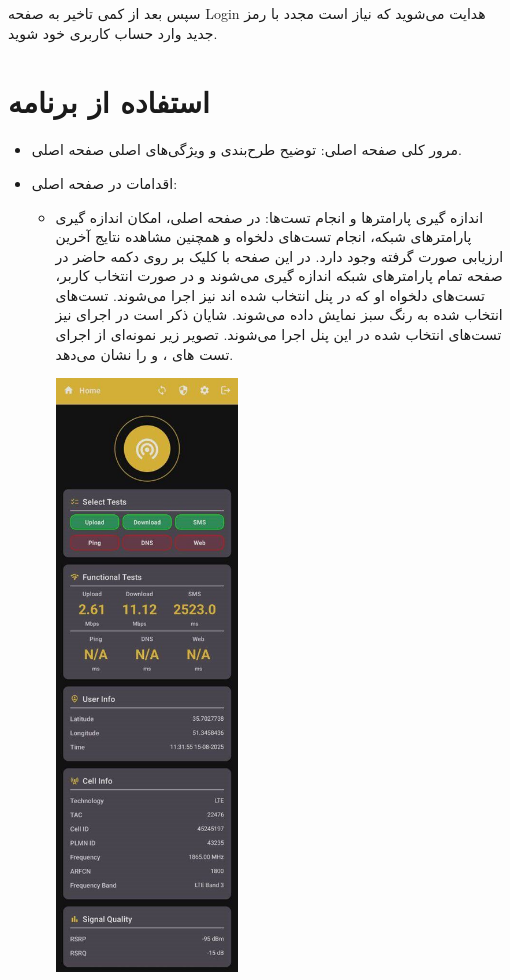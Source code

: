\begin{itemize}
\begin{itemize}
\begin{center}
			\end{center}
		سپس بعد از کمی تاخیر به صفحه Login هدایت می‌شوید که نیاز است مجدد با رمز جدید وارد حساب کاربری خود شوید.
	\end{itemize}
\end{itemize}
\section{استفاده از برنامه}
\begin{itemize}
	\item  مرور کلی صفحه اصلی: توضیح طرح‌بندی و ویژگی‌های اصلی صفحه اصلی.
	\item  اقدامات در صفحه اصلی:
	\begin{itemize}
            \item  اندازه گیری پارامترها و انجام تست‌ها:
                در صفحه اصلی، امکان اندازه گیری پارامتر‌های شبکه، انجام تست‌های دلخواه و همچنین مشاهده نتایج آخرین ارزیابی صورت گرفته وجود دارد.
                در این صفحه با کلیک بر روی دکمه حاضر در صفحه تمام پارامتر‌های شبکه اندازه گیری می‌شوند و در صورت انتخاب کاربر، تست‌های دلخواه او که در پنل  انتخاب شده اند نیز اجرا می‌شوند. تست‌های انتخاب شده به رنگ سبز نمایش داده می‌شوند. شایان ذکر است در اجرای  نیز تست‌های انتخاب شده در این پنل اجرا می‌شوند. 
                تصویر زیر نمونه‌ای از اجرای تست های ،  و  را نشان می‌دهد.
            \begin{center}
			\includegraphics[width=0.4\textwidth]{images/TestResults.jpeg}

\end{center}
\end{itemize}
\end{itemize}
